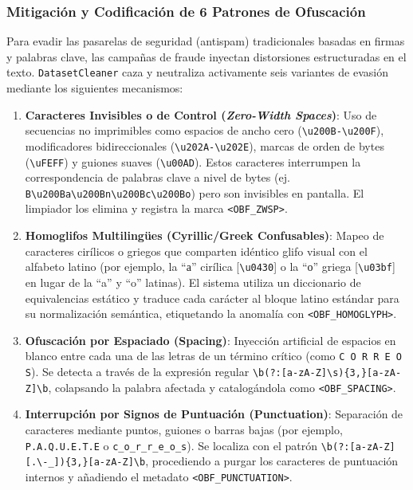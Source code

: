 \subsubsection{Mitigación y Codificación de 6 Patrones de Ofuscación}
Para evadir las pasarelas de seguridad (antispam) tradicionales basadas en firmas y palabras clave, las campañas de fraude inyectan distorsiones estructuradas en el texto. \texttt{DatasetCleaner} caza y neutraliza activamente seis variantes de evasión mediante los siguientes mecanismos:
\begin{enumerate}
    \item \textbf{Caracteres Invisibles o de Control (\textit{Zero-Width Spaces})}: Uso de secuencias no imprimibles como espacios de ancho cero (\texttt{\textbackslash u200B-\textbackslash u200F}), modificadores bidireccionales (\texttt{\textbackslash u202A-\textbackslash u202E}), marcas de orden de bytes (\texttt{\textbackslash uFEFF}) y guiones suaves (\texttt{\textbackslash u00AD}). Estos caracteres interrumpen la correspondencia de palabras clave a nivel de bytes (ej. \texttt{B\textbackslash u200Ba\textbackslash u200Bn\textbackslash u200Bc\textbackslash u200Bo}) pero son invisibles en pantalla. El limpiador los elimina y registra la marca \texttt{<OBF\_ZWSP>}.
    \item \textbf{Homoglifos Multilingües (Cyrillic/Greek Confusables)}: Mapeo de caracteres cirílicos o griegos que comparten idéntico glifo visual con el alfabeto latino (por ejemplo, la ``а'' cirílica [\texttt{\textbackslash u0430}] o la ``ο'' griega [\texttt{\textbackslash u03bf}] en lugar de la ``a'' y ``o'' latinas). El sistema utiliza un diccionario de equivalencias estático y traduce cada carácter al bloque latino estándar para su normalización semántica, etiquetando la anomalía con \texttt{<OBF\_HOMOGLYPH>}.
    \item \textbf{Ofuscación por Espaciado (Spacing)}: Inyección artificial de espacios en blanco entre cada una de las letras de un término crítico (como \texttt{C O R R E O S}). Se detecta a través de la expresión regular \texttt{\textbackslash b(?:[a-zA-Z]\textbackslash s)\{3,\}[a-zA-Z]\textbackslash b}, colapsando la palabra afectada y catalogándola como \texttt{<OBF\_SPACING>}.
    \item \textbf{Interrupción por Signos de Puntuación (Punctuation)}: Separación de caracteres mediante puntos, guiones o barras bajas (por ejemplo, \texttt{P.A.Q.U.E.T.E} o \texttt{c\_o\_r\_r\_e\_o\_s}). Se localiza con el patrón \texttt{\textbackslash b(?:[a-zA-Z][.\textbackslash -\_])\{3,\}[a-zA-Z]\textbackslash b}, procediendo a purgar los caracteres de puntuación internos y añadiendo el metadato \texttt{<OBF\_PUNCTUATION>}.

\end{enumerate}
